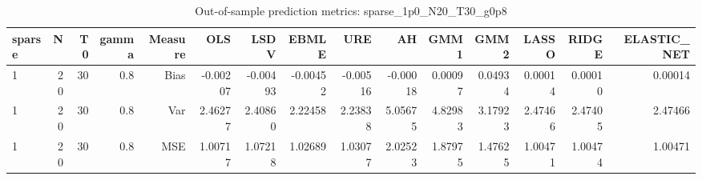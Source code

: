 \begin{table}[!htbp]\centering
\caption{Out-of-sample prediction metrics: sparse_1p0_N20_T30_g0p8}
\label{tab:table3_sparse_1p0_N20_T30_g0p8}
\begin{tabular}{lrrrrrrrrrrrrrr}
\hline
sparse & N & T0 & gamma & Measure & OLS & LSDV & EBMLE & URE & AH & GMM1 & GMM2 & LASSO & RIDGE & ELASTIC_NET \\
\hline
1 & 20 & 30 & 0.8 & Bias & -0.00207 & -0.00493 & -0.00452 & -0.00516 & -0.00018 & 0.00097 & 0.04934 & 0.00014 & 0.00010 & 0.00014 \\
1 & 20 & 30 & 0.8 & Var & 2.46277 & 2.40860 & 2.22458 & 2.23838 & 5.05675 & 4.82983 & 3.17923 & 2.47466 & 2.47405 & 2.47466 \\
1 & 20 & 30 & 0.8 & MSE & 1.00717 & 1.07218 & 1.02689 & 1.03077 & 2.02523 & 1.87975 & 1.47625 & 1.00471 & 1.00474 & 1.00471 \\
\hline
\end{tabular}
\end{table}


